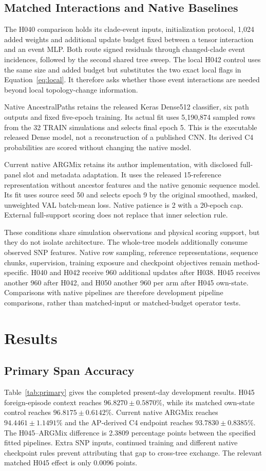 \documentclass[letterpaper]{article}
\begin{document}
\subsection{Matched Interactions and Native Baselines}
The H040 comparison holds its clade-event inputs, initialization protocol, 1,024 added weights and additional update budget fixed between a tensor interaction and an event MLP. Both route signed residuals through changed-clade event incidences, followed by the second shared tree sweep. The local H042 control uses the same size and added budget but substitutes the two exact local flags in Equation~\ref{eq:local}. It therefore asks whether those event interactions are needed beyond local topology-change information.

Native AncestralPaths retains the released Keras Dense512 classifier, six path outputs and fixed five-epoch training. Its actual fit uses 5,190,874 sampled rows from the 32 TRAIN simulations and selects final epoch 5. This is the executable released Dense model, not a reconstruction of a published CNN. Its derived C4 probabilities are scored without changing the native model.

Current native ARGMix retains its author implementation, with disclosed full-panel slot and metadata adaptation. It uses the released 15-reference representation without ancestor features and the native genomic sequence model. Its fit uses source seed 50 and selects epoch 9 by the original smoothed, masked, unweighted VAL batch-mean loss. Native patience is 2 with a 20-epoch cap. External full-support scoring does not replace that inner selection rule.

These conditions share simulation observations and physical scoring support, but they do not isolate architecture. The whole-tree models additionally consume observed SNP features. Native row sampling, reference representations, sequence chunks, supervision, training exposure and checkpoint objectives remain method-specific. H040 and H042 receive 960 additional updates after H038. H045 receives another 960 after H042, and H050 another 960 per arm after H045 own-state. Comparisons with native pipelines are therefore development pipeline comparisons, rather than matched-input or matched-budget operator tests.

\section{Results}
\subsection{Primary Span Accuracy}
Table~\ref{tab:primary} gives the completed present-day development results. H045 foreign-episode context reaches $96.8270\pm0.5870\%$, while its matched own-state control reaches $96.8175\pm0.6142\%$. Current native ARGMix reaches $94.4461\pm1.1491\%$ and the AP-derived C4 endpoint reaches $93.7830\pm0.8385\%$. The H045--ARGMix difference is 2.3809 percentage points between the specified fitted pipelines. Extra SNP inputs, continued training and different native checkpoint rules prevent attributing that gap to cross-tree exchange. The relevant matched H045 effect is only 0.0096 points.
\end{document}
